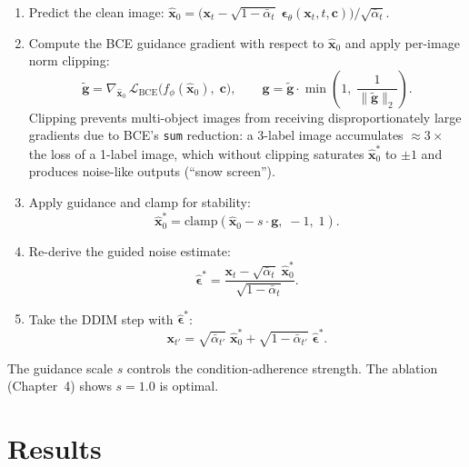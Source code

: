 \documentclass[12pt, a4paper]{report}
\begin{document}
\begin{enumerate}[noitemsep]
  \item Predict the clean image:
    $\hat{\mathbf{x}}_0
      = \bigl(\mathbf{x}_t
        - \sqrt{1-\bar\alpha_t}\;
          \boldsymbol\epsilon_\theta(\mathbf{x}_t,t,\mathbf{c})\bigr)
      / \sqrt{\bar\alpha_t}$.

  \item Compute the BCE guidance gradient with respect to $\hat{\mathbf{x}}_0$
        and apply per-image norm clipping:
    \[
      \tilde{\mathbf{g}}
        = \nabla_{\hat{\mathbf{x}}_0}\,
          \mathcal{L}_{\mathrm{BCE}}\!\bigl(
            f_\phi(\hat{\mathbf{x}}_0),\; \mathbf{c}
          \bigr),
      \qquad
      \mathbf{g}
        = \tilde{\mathbf{g}} \cdot \min\!\left(
            1,\; \frac{1}{\|\tilde{\mathbf{g}}\|_2}
          \right).
    \]
    Clipping prevents multi-object images from receiving disproportionately
    large gradients due to BCE's \texttt{sum} reduction:
    a 3-label image accumulates $\approx 3\times$ the loss of a 1-label image,
    which without clipping saturates $\hat{\mathbf{x}}_0^*$ to $\pm 1$
    and produces noise-like outputs (``snow screen'').

  \item Apply guidance and clamp for stability:
    \[
      \hat{\mathbf{x}}_0^*
        = \mathrm{clamp}\!\left(
            \hat{\mathbf{x}}_0 - s\cdot\mathbf{g},\; -1,\; 1
          \right).
    \]

  \item Re-derive the guided noise estimate:
    \[
      \hat{\boldsymbol\epsilon}^*
        = \frac{
            \mathbf{x}_t
            - \sqrt{\bar\alpha_t}\;\hat{\mathbf{x}}_0^*
          }{\sqrt{1-\bar\alpha_t}}.
    \]

  \item Take the DDIM step with $\hat{\boldsymbol\epsilon}^*$:
    \[
      \mathbf{x}_{t'}
        = \sqrt{\bar\alpha_{t'}}\;\hat{\mathbf{x}}_0^*
        + \sqrt{1-\bar\alpha_{t'}}\;\hat{\boldsymbol\epsilon}^*.
    \]
\end{enumerate}

The guidance scale $s$ controls the condition-adherence strength.
The ablation (Chapter~4) shows $s=1.0$ is optimal.

\chapter{Results}
\end{document}
